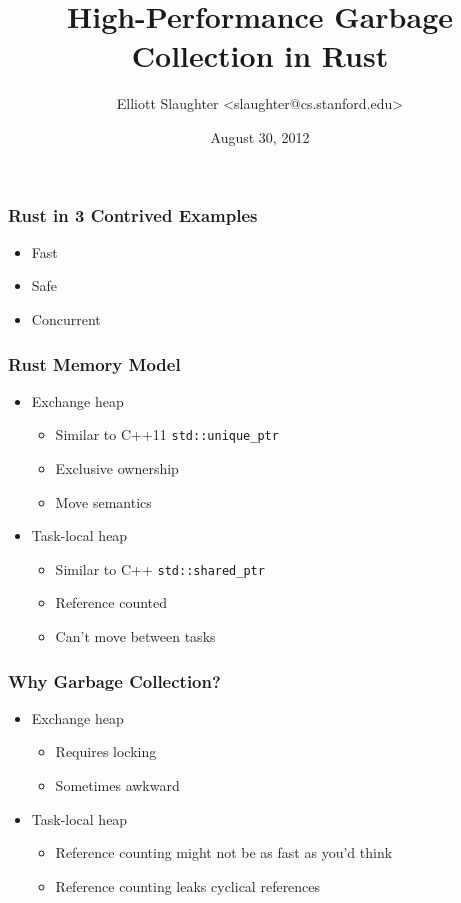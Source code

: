 \documentclass[ignorenonframetext,12pt]{beamer}
\title{High-Performance Garbage Collection in Rust}
\author{Elliott Slaughter \textless{}slaughter@cs.stanford.edu\textgreater{}}
\date{August 30, 2012}
\begin{document}
\frame{\titlepage}

\begin{frame}
\Large{}
\end{frame}

\begin{frame}[fragile]\frametitle{Rust in 3 Contrived Examples}
\begin{itemize}
  \item<alert@2> Fast
  \item<alert@3> Safe
  \item<alert@4> Concurrent
\end{itemize}

\begin{overlayarea}{\textwidth}{\textheight}
\only<2>{}
\end{overlayarea}
\end{frame}

\begin{frame}\frametitle{Rust Memory Model}
\begin{itemize}
  \item Exchange heap
  \begin{itemize}
    \item Similar to C++11 \texttt{std::unique\_ptr}
    \item Exclusive ownership
    \item Move semantics
  \end{itemize}
  \item Task-local heap
  \begin{itemize}
    \item Similar to C++ \texttt{std::shared\_ptr}
    \item Reference counted
    \item Can't move between tasks
  \end{itemize}
\end{itemize}
\end{frame}

\begin{frame}\frametitle{Why Garbage Collection?}
\begin{itemize}
  \item Exchange heap
  \begin{itemize}
    \item Requires locking
    \item Sometimes awkward
  \end{itemize}
  \item Task-local heap
  \begin{itemize}
    \item Reference counting might not be as fast as you'd think
    \item Reference counting leaks cyclical references
  \end{itemize}
\end{itemize}
\end{frame}
\end{document}
